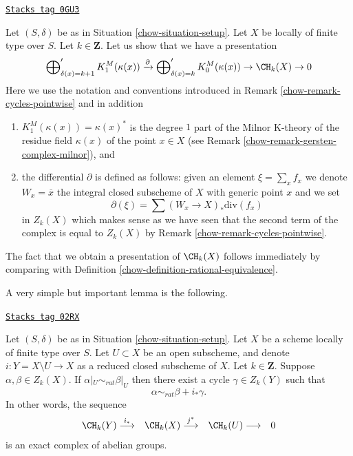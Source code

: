 \begin{remark}
\label{chow-remark-chow-group-pointwise}
\href{https://stacks.math.columbia.edu/tag/0GU3}{\texttt{Stacks tag 0GU3}}

Let $(S, \delta)$ be as in Situation \ref{chow-situation-setup}.
Let $X$ be locally of finite type over $S$. Let $k \in \mathbf{Z}$.
Let us show that we have a presentation
$$
\bigoplus\nolimits_{\delta(x) = k + 1}' K_1^M(\kappa(x))
\xrightarrow{\partial}
\bigoplus\nolimits_{\delta(x) = k}' K_0^M(\kappa(x)) \to
\CH_k(X) \to 0
$$
Here we use the notation and conventions introduced in
Remark \ref{chow-remark-cycles-pointwise} and in addition
\begin{enumerate}
\item $K_1^M(\kappa(x)) = \kappa(x)^*$ is the degree $1$ part of
the Milnor K-theory of the residue field $\kappa(x)$ of the point
$x \in X$ (see Remark \ref{chow-remark-gersten-complex-milnor}), and
\item the differential $\partial$ is defined as follows:
given an element $\xi = \sum_x f_x$ we denote $W_x = \overline{x}$
the integral closed subscheme of $X$ with generic point $x$ and we set
$$
\partial(\xi) = \sum (W_x \to X)_*\text{div}(f_x)
$$
in $Z_k(X)$ which makes sense as we have seen that the second
term of the complex is equal to $Z_k(X)$ by
Remark \ref{chow-remark-cycles-pointwise}.
\end{enumerate}
The fact that we obtain a presentation of $\CH_k(X)$ follows
immediately by comparing with Definition \ref{chow-definition-rational-equivalence}.
\end{remark}

A very simple but important lemma is the following.

\begin{lemma}
\label{chow-lemma-restrict-to-open}
\href{https://stacks.math.columbia.edu/tag/02RX}{\texttt{Stacks tag 02RX}}

Let $(S, \delta)$ be as in Situation \ref{chow-situation-setup}.
Let $X$ be a scheme locally of finite type over $S$.
Let $U \subset X$ be an open subscheme, and denote
$i : Y = X \setminus U \to X$ as a reduced closed subscheme of $X$.
Let $k \in \mathbf{Z}$.
Suppose $\alpha, \beta \in Z_k(X)$.
If $\alpha|_U \sim_{rat} \beta|_U$ then there exist a cycle
$\gamma \in Z_k(Y)$ such that
$$
\alpha \sim_{rat} \beta + i_*\gamma.
$$
In other words, the sequence
$$
\begin{array}{cccc}\CH_k(Y) \overset{i_*}{\longrightarrow} & \CH_k(X) \overset{j^*}{\longrightarrow} & \CH_k(U) \longrightarrow & 0\end{array}
$$
is an exact complex of abelian groups.
\end{lemma}

